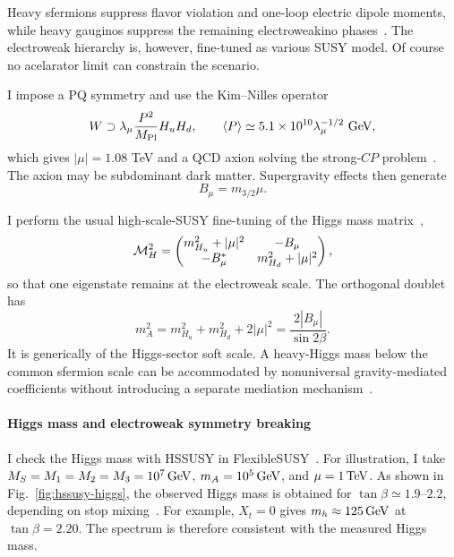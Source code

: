 \documentclass[superscriptaddress,aps,preprintnumbers,amsmath,amssymb,prd,nofootinbib,reprint]{revtex4-1}
\newcommand{\beq}{\begin{equation}}  \newcommand{\eeq}{\end{equation}}
\newcommand{\laq}[1]{\label{eq:#1}}
\newcommand{\vev}[1]{\left\langle {#1} \right\rangle}
\newcommand{\GEV}{\,{\rm GeV}}
\newcommand{\TEV}{\,{\rm TeV}}
\newcommand{\mpl}{M_{\rm Pl}}
\def\WY#1{#1}
\begin{document}
Heavy sfermions suppress flavor violation and one-loop electric dipole moments, while heavy gauginos suppress the remaining electroweakino phases~\cite{Gabbiani:1996hi,Nagata:2014wma}.  The electroweak hierarchy is, however, fine-tuned as various SUSY model. Of course no acelarator limit can constrain the scenario. 

\WY{I impose} a PQ symmetry and use the Kim--Nilles
operator~\cite{Kim:1983dt}
\begin{equation}
\laq{axion}
 W\supset\lambda_\mu\frac{P^2}{\mpl}H_uH_d,
 \qquad
\vev{P}\simeq5.1\times10^{10}\lambda_\mu^{-1/2}\ {\rm GeV},
\end{equation}
which gives $|\mu|=1.08$ TeV and a QCD axion solving the strong-$CP$
problem~\cite{Peccei:1977hh}.  The axion may be subdominant dark matter.  
\WY{Supergravity effects then generate}
\beq
B_\mu = m_{3/2} \mu.
\eeq

  \WY{I perform} the usual
high-scale-SUSY fine-tuning of the Higgs mass matrix~\cite{Jeong:2011sg},
\begin{equation}
 {\cal M}_H^2=
 \begin{pmatrix}
 m_{H_u}^2+|\mu|^2 & -B_\mu\\
 -B_\mu^* & m_{H_d}^2+|\mu|^2
 \end{pmatrix},
 \label{eq:higgs-mass-matrix}
\end{equation}
so that one eigenstate remains at the electroweak scale.  The orthogonal
doublet has
\begin{equation}
 m_A^2=m_{H_u}^2+m_{H_d}^2+2|\mu|^2
       =\frac{2|B_\mu|}{\sin2\beta}.
 \label{eq:heavy-higgs-mass}
\end{equation}
It is generically of the Higgs-sector soft scale.  A heavy-Higgs mass below
the common sfermion scale can be accommodated by nonuniversal
gravity-mediated coefficients without introducing a separate
mediation mechanism~\cite{Martin:1997ns,Yamaguchi:2016oqz}.

\paragraph{Higgs mass and electroweak symmetry breaking}

\WY{I check} the Higgs mass with HSSUSY in FlexibleSUSY~\cite{Athron:2017fvs}.
For illustration, \WY{I take} $M_S=M_1=M_2=M_3=10^7\GEV$,
$m_A=10^5\GEV$, and $\mu=1\TEV$.
As shown in Fig.~\ref{fig:hssusy-higgs}, the observed Higgs mass is obtained
for $\tan\beta\simeq1.9$--$2.2$, \WY{depending on stop mixing}~\cite{Bagnaschi:2014rsa}.  For example,
$X_t=0$ gives $m_h\approx 125\GEV$ at $\tan\beta=2.20$.  The spectrum is therefore
consistent with the measured Higgs mass.
\end{document}
